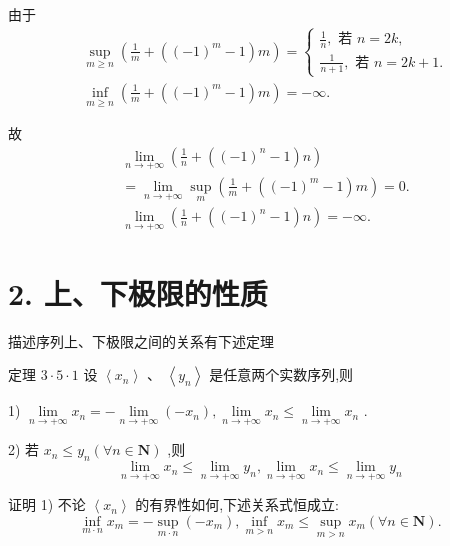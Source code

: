 由于
\begin{align*}
	&\mathop{\sup }\limits_{{m \geq  n}}\left( {\frac{1}{m} + \left( {{\left( -1\right) }^{m} - 1}\right) m}\right)  = \left\{  \begin{array}{l} \frac{1}{n},\text{ 若 }n = {2k}, \\  \frac{1}{n + 1},\text{ 若 }n = {2k} + 1. \end{array}\right.\\
	&\mathop{\inf }\limits_{{m \geq  n}}\left( {\frac{1}{m} + \left( {{\left( -1\right) }^{m} - 1}\right) m}\right)  =  - \infty .
\end{align*}

故
\begin{align*}
	&\mathop{\lim }\limits_{{n \rightarrow   + \infty }}\left( {\frac{1}{n} + \left( {{\left( -1\right) }^{n} - 1}\right) n}\right)\\
	&= \mathop{\lim }\limits_{{n \rightarrow   + \infty }}\mathop{\sup }\limits_{m}\left( {\frac{1}{m} + \left( {{\left( -1\right) }^{m} - 1}\right) m}\right)  = 0.\\
	&\mathop{\lim }\limits_{{n \rightarrow   + \infty }}\left( {\frac{1}{n} + \left( {{\left( -1\right) }^{n} - 1}\right) n}\right)  =  - \infty .
\end{align*}

\section*{2. 上、下极限的性质}

描述序列上、下极限之间的关系有下述定理

定理 $3 \cdot  5 \cdot  1$ 设 $\left\langle  {x}_{n}\right\rangle  \text{ 、 }\left\langle  {y}_{n}\right\rangle$ 是任意两个实数序列,则

1) $\mathop{\lim }\limits_{{n \rightarrow   + \infty }}{x}_{n} =  - \mathop{\lim }\limits_{{n \rightarrow   + \infty }}\left( {-{x}_{n}}\right) ,\mathop{\lim }\limits_{{n \rightarrow   + \infty }}{x}_{n} \leq  \mathop{\lim }\limits_{{n \rightarrow   + \infty }}{x}_{n}$ .

2) 若 ${x}_{n} \leq  {y}_{n}\left( {\forall n \in  \mathbf{N}}\right)$ ,则
$$\mathop{\lim }\limits_{{n \rightarrow   + \infty }}{x}_{n} \leq  \mathop{\lim }\limits_{{n \rightarrow   + \infty }}{y}_{n},\mathop{\lim }\limits_{{n \rightarrow   + \infty }}{x}_{n} \leq  \mathop{\lim }\limits_{{n \rightarrow   + \infty }}{y}_{n}$$

证明 1) 不论 $\left\langle  {x}_{n}\right\rangle$ 的有界性如何,下述关系式恒成立:
$$\mathop{\inf }\limits_{{m \cdot  n}}{x}_{m} =  - \mathop{\sup }\limits_{{m \cdot  n}}\left( {-{x}_{m}}\right) ,\mathop{\inf }\limits_{{m > n}}{x}_{m} \leq  \mathop{\sup }\limits_{{m > n}}{x}_{m}\left( {\forall n \in  \mathbf{N}}\right) .$$

